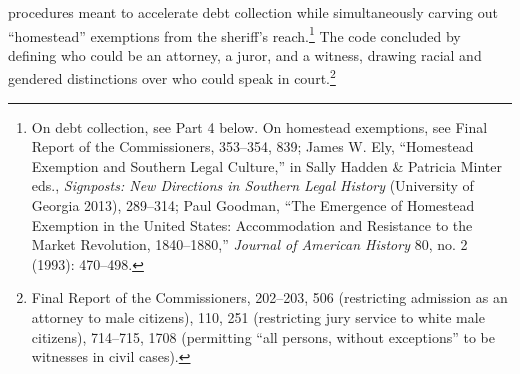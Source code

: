 \documentclass[12pt,]{article}
\let\rmarkdownfootnote\footnote%
\def\footnote{\protect\rmarkdownfootnote}
\begin{document}
procedures meant to accelerate debt collection while simultaneously
carving out ``homestead'' exemptions from the sheriff's reach.\footnote{On
  debt collection, see Part 4 below. On homestead exemptions, see Final
  Report of the Commissioners, 353--354, 839; James W. Ely, ``Homestead
  Exemption and Southern Legal Culture,'' in Sally Hadden \& Patricia
  Minter eds., \emph{Signposts: New Directions in Southern Legal
  History} (University of Georgia 2013), 289--314; Paul Goodman, ``The
  Emergence of Homestead Exemption in the United States: Accommodation
  and Resistance to the Market Revolution, 1840--1880,'' \emph{Journal
  of American History} 80, no. 2 (1993): 470--498.} The code concluded
by defining who could be an attorney, a juror, and a witness, drawing
racial and gendered distinctions over who could speak in
court.\footnote{Final Report of the Commissioners, 202--203, 506
  (restricting admission as an attorney to male citizens), 110, 251
  (restricting jury service to white male citizens), 714--715, 1708
  (permitting ``all persons, without exceptions'' to be witnesses in
  civil cases).}
\end{document}
